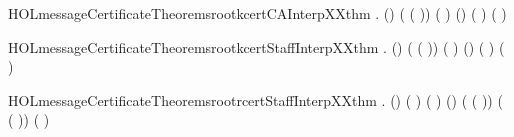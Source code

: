 \newcommand{\HOLmessageCertificateTheoremsrcrtStaffInterpXXthm}{\UseVerbatim{HOLmessageCertificateTheoremsrcrtStaffInterpXXthm}}
\begin{SaveVerbatim}{HOLmessageCertificateTheoremsrootkcertCAInterpXXthm}
\HOLTokenTurnstile{} \HOLSymConst{\HOLTokenForall{}}    .
     (\HOLSymConst{,}\HOLSymConst{,}) 
      ( ( )) ( ) \HOLSymConst{\HOLTokenEquiv{}}
     (\HOLSymConst{,}\HOLSymConst{,})   ( )   ( )
\end{SaveVerbatim}
\newcommand{\HOLmessageCertificateTheoremsrootkcertCAInterpXXthm}{\UseVerbatim{HOLmessageCertificateTheoremsrootkcertCAInterpXXthm}}
\begin{SaveVerbatim}{HOLmessageCertificateTheoremsrootkcertStaffInterpXXthm}
\HOLTokenTurnstile{} \HOLSymConst{\HOLTokenForall{}}    .
     (\HOLSymConst{,}\HOLSymConst{,}) 
      ( ( )) ( ) \HOLSymConst{\HOLTokenEquiv{}}
     (\HOLSymConst{,}\HOLSymConst{,}) 
      ( )   ( )
\end{SaveVerbatim}
\newcommand{\HOLmessageCertificateTheoremsrootkcertStaffInterpXXthm}{\UseVerbatim{HOLmessageCertificateTheoremsrootkcertStaffInterpXXthm}}
\begin{SaveVerbatim}{HOLmessageCertificateTheoremsrootrcertStaffInterpXXthm}
\HOLTokenTurnstile{} \HOLSymConst{\HOLTokenForall{}}     .
     (\HOLSymConst{,}\HOLSymConst{,}) 
      ( ) ( )  \HOLSymConst{\HOLTokenEquiv{}}
     (\HOLSymConst{,}\HOLSymConst{,}) 
      ( ( )) ( ( ))
       ( )
\end{SaveVerbatim}
